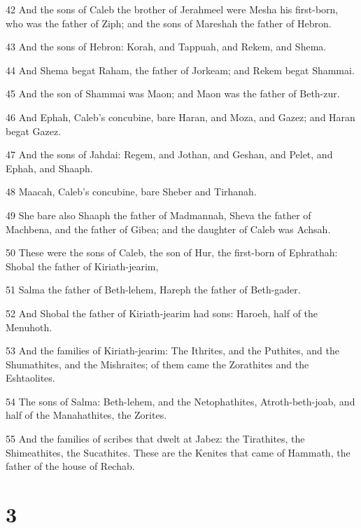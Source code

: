 \par 42 And the sons of Caleb the brother of Jerahmeel were Mesha his first-born, who was the father of Ziph; and the sons of Mareshah the father of Hebron.
\par 43 And the sons of Hebron: Korah, and Tappuah, and Rekem, and Shema.
\par 44 And Shema begat Raham, the father of Jorkeam; and Rekem begat Shammai.
\par 45 And the son of Shammai was Maon; and Maon was the father of Beth-zur.
\par 46 And Ephah, Caleb's concubine, bare Haran, and Moza, and Gazez; and Haran begat Gazez.
\par 47 And the sons of Jahdai: Regem, and Jothan, and Geshan, and Pelet, and Ephah, and Shaaph.
\par 48 Maacah, Caleb's concubine, bare Sheber and Tirhanah.
\par 49 She bare also Shaaph the father of Madmannah, Sheva the father of Machbena, and the father of Gibea; and the daughter of Caleb was Achsah.
\par 50 These were the sons of Caleb, the son of Hur, the first-born of Ephrathah: Shobal the father of Kiriath-jearim,
\par 51 Salma the father of Beth-lehem, Hareph the father of Beth-gader.
\par 52 And Shobal the father of Kiriath-jearim had sons: Haroeh, half of the Menuhoth.
\par 53 And the families of Kiriath-jearim: The Ithrites, and the Puthites, and the Shumathites, and the Mishraites; of them came the Zorathites and the Eshtaolites.
\par 54 The sons of Salma: Beth-lehem, and the Netophathites, Atroth-beth-joab, and half of the Manahathites, the Zorites.
\par 55 And the families of scribes that dwelt at Jabez: the Tirathites, the Shimeathites, the Sucathites. These are the Kenites that came of Hammath, the father of the house of Rechab.

\chapter{3}

